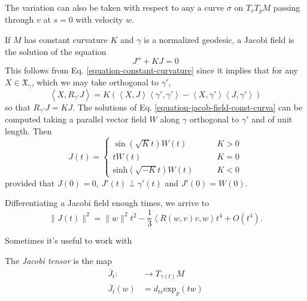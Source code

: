 \begin{remark}
\label{remark-everyday-jacobi}
The variation can also be taken
with respect to
any a curve $\sigma$ on $T_vT_{p}M$ passing
through $v$
at $s=0$ with velocity $w$.
\end{remark}

\begin{example}
\label{example-jacob-field-const-curva}
If $M$ has constant curvature $K$ and
$\gamma$ is a normalized geodesic, a
Jacobi field is the solution of the equation
\begin{equation}
\label{equation-jacob-field-const-curva}
J''+KJ=0
\end{equation}
This follows from Eq.
\ref{equation-constant-curvature} since it
implies that
for any $X\in\mathfrak{X}_\gamma$, which we
may take orthogonal to $\gamma'$,
$$
\left\langle{}X,R_{\gamma'}J\right\rangle{}
=K(\left\langle{}X,J\right\rangle{}\left\langle{}\gamma',
\gamma'\right\rangle{}
-\left\langle{}X,\gamma'\right\rangle{}\left\langle{}J,
\gamma'\right\rangle{})
$$
so that $R_{\gamma'}J=KJ$. The solutions of
Eq.
\ref{equation-jacob-field-const-curva} can be
computed taking a
parallel vector field $W$ along $\gamma$
orthogonal to $\gamma'$ and of unit
length. Then
\begin{equation}
\label{equation-jacob-field-const-curva-2}
J(t)=\begin{cases}
\sin(\sqrt{K}t)W(t)\qquad & K>0\\
tW(t)\qquad &K=0\\
\text{sinh}(\sqrt{-K}t)W(t)\qquad &K<0
\end{cases}
\end{equation}
provided that $J(0)=0$, $J'(t)\perp
\gamma'(t)$ and $J'(0)=W(0)$.
\end{example}

\begin{proposition}
\label{proposition-jacob-field-taylo-expan}
Differentiating a Jacobi field enough times,
we arrive to
\begin{equation}
\label{equation-jacob-field-taylo-expan}
\|J(t)\|^2=\|w\|^2t^2-\frac{1}{3}\left\langle{}R(w,v)
v,w\right\rangle{}t^4+O(t^4).
\end{equation}
\end{proposition}

Sometimes it's useful to work with

\begin{definition}
\label{definition-Jacobi-tensor}
The {\it Jacobi tensor} is the map
$$
\begin{aligned}
	\overline{J}_t:  &\longrightarrow
	T_{\gamma(t)}M \\
	 \overline{J}_t(w)&=d_{tv}\text{exp}_p(tw)
\end{aligned}
$$
\end{definition}

